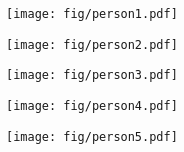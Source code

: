 \begin{figure*}[htbp]
    \begin{subfigure}{0.19\linewidth}
        \begin{minipage}[t]{1.0\linewidth}
            \centering
            \texttt{[image: fig/person1.pdf]}
        \end{minipage}
    \end{subfigure}
    \hfill
    \begin{subfigure}{0.19\linewidth}
        \begin{minipage}[t]{1.0\linewidth}
            \centering
            \texttt{[image: fig/person2.pdf]}
        \end{minipage}
    \end{subfigure}
    \hfill
    \begin{subfigure}{0.19\linewidth}
        \begin{minipage}[t]{1.0\linewidth}
            \centering
            \texttt{[image: fig/person3.pdf]}
        \end{minipage}
    \end{subfigure}
    \hfill
    \begin{subfigure}{0.19\linewidth}
        \begin{minipage}[t]{1.0\linewidth}
            \centering
            \texttt{[image: fig/person4.pdf]}
        \end{minipage}
    \end{subfigure}
    \hfill
    \begin{subfigure}{0.19\linewidth}
        \begin{minipage}[t]{1.0\linewidth}
            \centering
            \texttt{[image: fig/person5.pdf]}
        \end{minipage}
    \end{subfigure}


\end{figure*}
